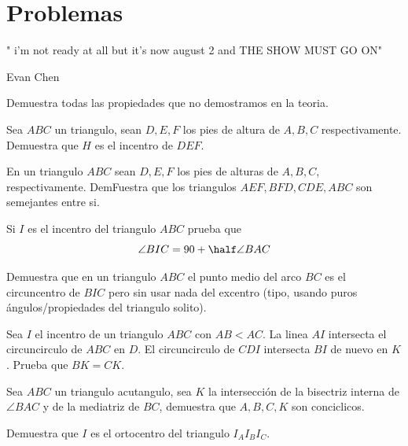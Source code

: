\documentclass[11pt]{scrartcl}
\newcommand{\gad}{\textcolor{yellow}{$\bigstar$}}
\newcommand{\thmdifficulty}{0}
\newcommand{\problemdiff}[1]{\renewcommand{\thmdifficulty}{#1}}
\begin{document}
\newpage

\section{Problemas}
\epigraph{" i'm not ready at all but it's now august 2 and THE SHOW MUST GO ON"
}{Evan Chen}

\begin{problem}[\gad]
Demuestra todas las propiedades que no demostramos en la teoria.
\end{problem}


\problemdiff{1}
\begin{problem}
    Sea $ABC$ un triangulo, sean $D,E,F$ los pies de altura de $A,B,C$ respectivamente. Demuestra que $H$ es el incentro de $DEF$.
\end{problem}

\problemdiff{1}
\begin{problem}
    En un triangulo $ABC$ sean $D,E,F$ los pies de alturas de $A,B,C$, respectivamente. DemFuestra que los triangulos $AEF, BFD, CDE, ABC$ 
    son semejantes entre si.
\end{problem}




\problemdiff{2}
\begin{problem}
Si $I$ es el incentro del triangulo $ABC$ prueba que 
$$\angle BIC =90+\half \angle BAC$$
\end{problem}

\problemdiff{3}
\begin{problem}
Demuestra que en un triangulo $ABC$ el punto medio del arco $BC$ es el circuncentro de $BIC$ pero sin usar nada del excentro (tipo, usando puros \'angulos/propiedades del triangulo solito).
\end{problem}

\problemdiff{2}
\begin{problem}
    Sea $I$ el incentro de un triangulo $ABC$ con $AB<AC$. La linea $AI$ intersecta el circuncirculo de $ABC$ en $D$. El circuncirculo de $CDI$ intersecta $BI$ de nuevo en $K$. Prueba que $BK=CK$.
\end{problem}

\problemdiff{2}
\begin{problem}
    Sea $ABC$ un triangulo acutangulo, sea $K$ la intersecci\'on de la bisectriz interna de $\angle BAC$ y de la mediatriz de $BC$, demuestra que $A,B,C,K$ son conciclicos.
\end{problem}

\problemdiff{2}
\begin{problem}
    Demuestra que $I$ es el ortocentro del triangulo $I_AI_BI_C$.
\end{problem}
\end{document}
